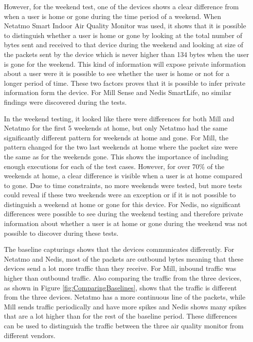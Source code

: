 However, for the weekend test, one of the devices shows a clear difference from when a user is home or gone during the time period of a weekend. When Netatmo Smart Indoor Air Quality Monitor was used, it shows that it is possible to distinguish whether a user is home or gone by looking at the total number of bytes sent and received to that device during the weekend and looking at size of the packets sent by the device which is never higher than 134 bytes when the user is gone for the weekend. This kind of information will expose private information about a user were it is possible to see whether the user is home or not for a longer period of time. These two factors proves that it is possible to infer private information form the device. For Mill Sense and Nedis SmartLife, no similar findings were discovered during the tests. 

In the weekend testing, it looked like there were differences for both Mill and Netatmo for the first 5 weekends at home, but only Netatmo had the same significantly different pattern for weekends at home and gone. For Mill, the pattern changed for the two last weekends at home where the packet size were the same as for the weekends gone. This shows the importance of including enough executions for each of the test cases. However, for over 70\% of the weekends at home, a clear difference is visible when a user is at home compared to gone. Due to time constraints, no more weekends were tested, but more tests could reveal if these two weekends were an exception or if it is not possible to distinguish a weekend at home or gone for this device. For Nedis, no significant differences were possible to see during the weekend testing and therefore private information about whether a user is at home or gone during the weekend was not possible to discover during these tests. 

The baseline capturings shows that the devices communicates differently. For Netatmo and Nedis, most of the packets are outbound bytes meaning that these devices send a lot more traffic than they receive. For Mill, inbound traffic was higher than outbound traffic. Also comparing the traffic from the three devices, as shown in Figure \ref{fig:ComparingBaselines}, shows that the traffic is different from the three devices. Netatmo has a more continuous line of the packets, while Mill sends traffic periodically and have more spikes and Nedis shows many spikes that are a lot higher than for the rest of the baseline period. These differences can be used to distinguish the traffic between the three air quality monitor from different vendors. 

